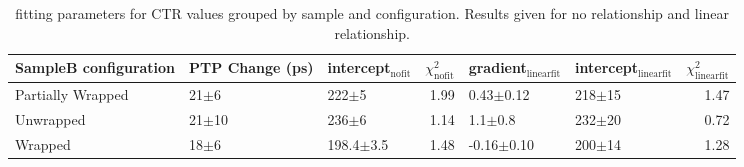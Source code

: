 \begin{table}
\caption{\label{tab:ctrfit-20-results} fitting parameters for CTR values grouped by sample and configuration. Results given for no relationship and linear relationship.}
\begin{tabular}{lllrllr}
\hline
SampleB configuration & PTP Change (ps) & intercept$_\text{nofit}$ &  $\chi^2_\text{nofit}$ & gradient$_\text{linearfit}$ & intercept$_\text{linearfit}$ &  $\chi^2_\text{linearfit}$ \\
\hline
Partially Wrapped   &   21$\pm$6 &       222$\pm$5 &                   1.99 &       0.43$\pm$0.12 &         218$\pm$15 &                    1.47 \\
Unwrapped     &  21$\pm$10 &       236$\pm$6 &                   1.14 &         1.1$\pm$0.8 &         232$\pm$20 &                    0.72 \\
Wrapped       &   18$\pm$6 &   198.4$\pm$3.5 &                   1.48 &      -0.16$\pm$0.10 &         200$\pm$14 &                    1.28 \\
\hline
\end{tabular}
\end{table}
